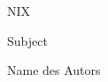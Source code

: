 \documentclass[a4paper,10pt]{tubsartcl}
\begin{document}
\begin{titlepage}
\begin{titlerow}[bgimage=titlepicture]{2}\end{titlerow}
\begin{titlerow}[bgcolor=tuSecondaryDark]{1}NIX\end{titlerow}
\begin{titlerow}[bgcolor=tuSecondaryLight]{2}Subject\end{titlerow}
\begin{titlerow}[bgcolor=tuSecondary]{1}\date{}\end{titlerow}
\begin{titlerow}[bgcolor=tuSecondaryLight]{2}\sffamily\huge Name des Autors\end{titlerow}
\end{titlepage}
\end{document}
